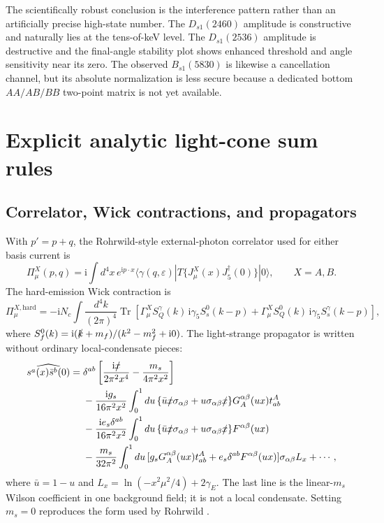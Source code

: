 \documentclass[11pt]{article}
\newcommand{\ii}{\mathrm{i}}
\newcommand{\Dsone}{D_{s1}}
\newcommand{\Bsone}{B_{s1}}
\begin{document}
The scientifically robust conclusion is the interference pattern rather than
an artificially precise high-state number.  The $\Dsone(2460)$ amplitude is
constructive and naturally lies at the tens-of-keV level.  The
$\Dsone(2536)$ amplitude is destructive and the final-angle stability plot
shows enhanced threshold and angle sensitivity near its zero.  The observed
$\Bsone(5830)$ is likewise a cancellation channel, but its absolute
normalization is less secure because a dedicated bottom $AA/AB/BB$ two-point
matrix is not yet available.

\appendix

\section{Explicit analytic light-cone sum rules}
\label{app:lcsr}

\subsection{Correlator, Wick contractions, and propagators}

With $p'=p+q$, the Rohrwild-style external-photon correlator used for either
basis current is
\begin{equation}
 \Pi_\mu^X(p,q)=\ii\int d^4x\,e^{\ii p\cdot x}
 \langle\gamma(q,\varepsilon)|
 T\{J_\mu^X(x)J_5^\dagger(0)\}|0\rangle,\qquad X=A,B .
 \label{eq:app-correlator}
\end{equation}
The hard-emission Wick contraction is
\begin{equation}
 \Pi_{\mu}^{X,\mathrm{hard}}
 =-\ii N_c\!\int\!\frac{d^4k}{(2\pi)^4}
 \operatorname{Tr}\!\left[
 \Gamma_\mu^X S_Q^\gamma(k)\,\ii\gamma_5 S_s^0(k-p)
 +\Gamma_\mu^X S_Q^0(k)\,\ii\gamma_5 S_s^\gamma(k-p)
 \right],
 \label{eq:app-wick}
\end{equation}
where $S_f^0(k)=\ii(\slashed{k}+m_f)/(k^2-m_f^2+\ii0)$.
The light-strange propagator is written without ordinary local-condensate
pieces:
\begin{align}
 \widehat{s^a(x)\bar s^b(0)}={}&
 \delta^{ab}\left[\frac{\ii\slashed{x}}{2\pi^2x^4}
 -\frac{m_s}{4\pi^2x^2}\right]\nonumber\\
 &-\frac{\ii g_s}{16\pi^2x^2}\int_0^1du\,
 \{\bar u\slashed{x}\sigma_{\alpha\beta}
 +u\sigma_{\alpha\beta}\slashed{x}\}
 G_A^{\alpha\beta}(ux)t^A_{ab}\nonumber\\
 &-\frac{\ii e_s\delta^{ab}}{16\pi^2x^2}\int_0^1du\,
 \{\bar u\slashed{x}\sigma_{\alpha\beta}
 +u\sigma_{\alpha\beta}\slashed{x}\}
 F^{\alpha\beta}(ux)\nonumber\\
 &-\frac{m_s}{32\pi^2}\int_0^1du\,
 [g_sG_A^{\alpha\beta}(ux)t^A_{ab}
 +e_s\delta^{ab}F^{\alpha\beta}(ux)]
 \sigma_{\alpha\beta}L_x+\cdots ,
 \label{eq:app-light-propagator}
\end{align}
where $\bar u=1-u$ and
$L_x=\ln(-x^2\mu^2/4)+2\gamma_E$.  The last line is the linear-$m_s$ Wilson
coefficient in one background field; it is not a local condensate.  Setting
$m_s=0$ reproduces the form used by Rohrwild \cite{Rohrwild2007}.
\end{document}
